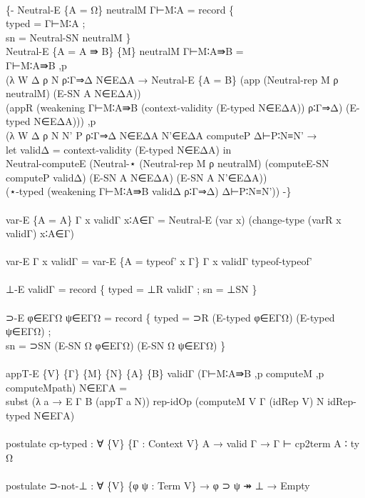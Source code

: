 {\begin{code}
{\>\<\\
\>\{- Neutral-E \{A = Ω\} neutralM Γ⊢M∶A = record \{ \<\\
\>  typed = Γ⊢M∶A ; \<\\
\>  sn = Neutral-SN neutralM \}\<\\
\>Neutral-E \{A = A ⇛ B\} \{M\} neutralM Γ⊢M∶A⇛B = \<\\
\>  Γ⊢M∶A⇛B ,p \<\\
\>  (λ W Δ ρ N ρ∶Γ⇒Δ N∈EΔA → Neutral-E \{A = B\} (app (Neutral-rep M ρ neutralM) (E-SN A N∈EΔA)) \<\\
\>    (appR (weakening Γ⊢M∶A⇛B (context-validity (E-typed N∈EΔA)) ρ∶Γ⇒Δ) (E-typed N∈EΔA))) ,p \<\\
\>  (λ W Δ ρ N N' P ρ∶Γ⇒Δ N∈EΔA N'∈EΔA computeP Δ⊢P∶N≡N' → \<\\
\>    let validΔ = context-validity (E-typed N∈EΔA) in\<\\
\>    Neutral-computeE (Neutral-⋆ (Neutral-rep M ρ neutralM) (computeE-SN computeP validΔ) (E-SN A N∈EΔA) (E-SN A N'∈EΔA)) \<\\
\>    (⋆-typed (weakening Γ⊢M∶A⇛B validΔ ρ∶Γ⇒Δ) Δ⊢P∶N≡N')) -\}\<\\
\>\<\\
\>var-E \{A = A\} Γ x validΓ x∶A∈Γ = Neutral-E (var x) (change-type (varR x validΓ) x∶A∈Γ)\<\\
\>\<\\
\>var-E Γ x validΓ = var-E \{A = typeof' x Γ\} Γ x validΓ typeof-typeof'\<\\
\>\<\\
\>⊥-E validΓ = record \{ typed = ⊥R validΓ ; sn = ⊥SN \}\<\\
\>\<\\
\>⊃-E φ∈EΓΩ ψ∈EΓΩ = record \{ typed = ⊃R (E-typed φ∈EΓΩ) (E-typed ψ∈EΓΩ) ; \<\\
\>  sn = ⊃SN (E-SN Ω φ∈EΓΩ) (E-SN Ω ψ∈EΓΩ) \}\<\\
\>\<\\
\>appT-E \{V\} \{Γ\} \{M\} \{N\} \{A\} \{B\} validΓ (Γ⊢M∶A⇛B ,p computeM ,p computeMpath) N∈EΓA = \<\\
\>  subst (λ a → E Γ B (appT a N)) rep-idOp (computeM V Γ (idRep V) N idRep-typed N∈EΓA)\<\\
\>\<\\
\>postulate cp-typed : ∀ \{V\} \{Γ : Context V\} A → valid Γ → Γ ⊢ cp2term A ∶ ty Ω\<\\
\>\<\\
\>postulate ⊃-not-⊥ : ∀ \{V\} \{φ ψ : Term V\} → φ ⊃ ψ ↠ ⊥ → Empty\<\\
}
\end{code}}
